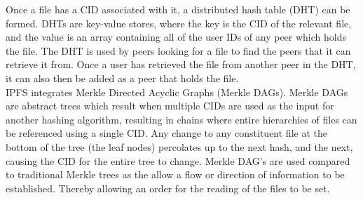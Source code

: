 Once a file has a CID associated with it, a distributed hash table (DHT) can be formed. DHTs are key-value stores, where the key is the CID of the relevant file, and the value is an array containing all of the user IDs of any peer which holds the file. The DHT is used by peers looking for a file to find the peers that it can retrieve it from. Once a user has retrieved the file from another peer in the DHT, it can also then be added as a peer that holds the file. \\

IPFS integrates Merkle Directed Acyclic Graphs (Merkle DAGs). Merkle DAGs are abstract trees which result when multiple CIDs are used as the input for another hashing algorithm, resulting in chains where entire hierarchies of files can be referenced using a single CID. Any change to any constituent file at the bottom of the tree (the leaf nodes) percolates up to the next hash, and the next, causing the CID for the entire tree to change. Merkle DAG's are used compared to traditional Merkle trees as the allow a flow or direction of information to be established. Thereby allowing an order for the reading of the files to be set. 
